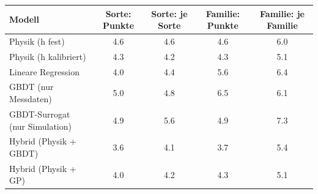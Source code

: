 \begin{tabular}{@{}lS[table-format=1.1]S[table-format=1.1]S[table-format=1.1]S[table-format=1.1]@{}}
\toprule
Modell & {Sorte: Punkte} & {Sorte: je Sorte} & {Familie: Punkte} & {Familie: je Familie} \\
\midrule
Physik (h fest) & 4.6 & 4.6 & 4.6 & 6.0 \\
Physik (h kalibriert) & 4.3 & 4.2 & 4.3 & 5.1 \\
Lineare Regression & 4.0 & 4.4 & 5.6 & 6.4 \\
GBDT (nur Messdaten) & 5.0 & 4.8 & 6.5 & 6.1 \\
GBDT-Surrogat (nur Simulation) & 4.9 & 5.6 & 4.9 & 7.3 \\
Hybrid (Physik + GBDT) & 3.6 & 4.1 & 3.7 & 5.4 \\
Hybrid (Physik + GP) & 4.0 & 4.2 & 4.3 & 5.1 \\
\bottomrule
\end{tabular}
